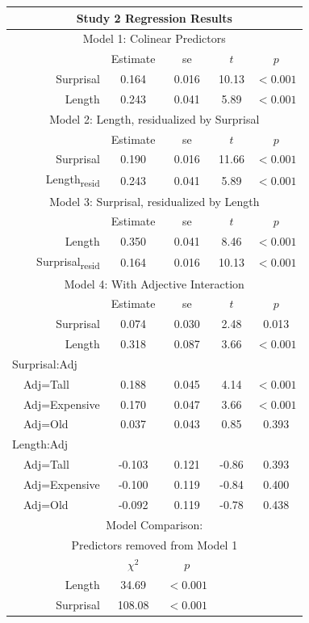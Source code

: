 \begin{appendices}
\vspace{4mm}

\noindent
\footnotesize{
\begin{tabular}{r|cccc}
\hline
\hline
\multicolumn{5}{c}{\textbf{Study 2 Regression Results}} \\
\hline
\hline
\multicolumn{5}{c}{Model 1: Colinear Predictors} \\
& Estimate & se & $t$ & $p$ \\
\hline
Surprisal & 0.164 & 0.016 & 10.13 & $<0.001$ \\
Length & 0.243 & 0.041 & 5.89 & $<0.001$ \\
\hline
\hline
\multicolumn{5}{c}{Model 2: Length, residualized by Surprisal} \\
& Estimate & se & $t$ & $p$ \\
\hline
Surprisal & 0.190 & 0.016 & 11.66 & $<0.001$ \\
Length\textsubscript{resid} & 0.243 & 0.041 & 5.89 & $<0.001$ \\
\hline
\hline
\multicolumn{5}{c}{Model 3: Surprisal, residualized by Length} \\
& Estimate & se & $t$ & $p$ \\
\hline
Length & 0.350 & 0.041 & 8.46 & $<0.001$ \\
Surprisal\textsubscript{resid} & 0.164 & 0.016 & 10.13 & $<0.001$ \\
\hline
\hline
\multicolumn{5}{c}{Model 4: With Adjective Interaction} \\
& Estimate & se & $t$ & $p$ \\
\hline
Surprisal & 0.074 & 0.030 & 2.48 & 0.013 \\
Length & 0.318 & 0.087 & 3.66 & $<0.001$ \\
\multicolumn{1}{l|}{Surprisal:Adj} & & & & \\
\multicolumn{1}{l|}{\ \ Adj=Tall} & 0.188 & 0.045 & 4.14 & $<0.001$ \\
\multicolumn{1}{l|}{\ \ Adj=Expensive} & 0.170 & 0.047 & 3.66 & $<0.001$ \\
\multicolumn{1}{l|}{\ \ Adj=Old} & 0.037 & 0.043 & 0.85 & 0.393 \\
\multicolumn{1}{l|}{Length:Adj} & & & & \\
\multicolumn{1}{l|}{\ \ Adj=Tall} & -0.103 & 0.121 & -0.86 & 0.393 \\
\multicolumn{1}{l|}{\ \ Adj=Expensive} & -0.100 & 0.119 & -0.84 & 0.400 \\
\multicolumn{1}{l|}{\ \ Adj=Old} & -0.092 & 0.119 & -0.78 & 0.438 \\
\hline
\hline
\multicolumn{5}{c}{Model Comparison:} \\
\multicolumn{5}{c}{Predictors removed from Model 1} \\
& $\chi^2$ & $p$ \\
\hline
Length & 34.69 & $<0.001$ \\
Surprisal & 108.08 & $<0.001$ \\
\hline
\hline
\end{tabular}
}




\end{appendices}
